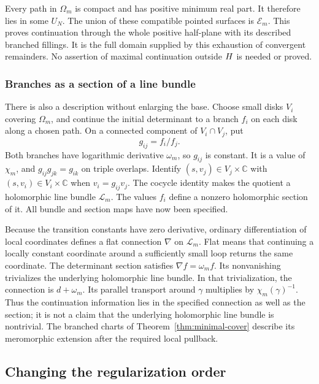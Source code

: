 Every path in \(\Omega_m\) is compact and has positive minimum real
part.  It therefore lies in some \(U_N\).  The union of these compatible
pointed surfaces is \(\mathcal E_m\).  This proves continuation through
the whole positive half-plane with its described branched fillings.
It is the full domain supplied by this exhaustion of convergent
remainders.  No assertion of maximal continuation outside \(H\) is
needed or proved.

\subsubsection{Branches as a section of a line bundle}

There is also a description without enlarging the base.
Choose small disks \(V_i\) covering \(\Omega_m\), and continue the
initial determinant to a branch \(f_i\) on each disk along a chosen path.
On a connected component of \(V_i\cap V_j\), put
\[
 g_{ij}=f_i/f_j.
\]
Both branches have logarithmic derivative \(\omega_m\), so \(g_{ij}\)
is constant.  It is a value of \(\chi_m\), and
\(g_{ij}g_{jk}=g_{ik}\) on triple overlaps.
Identify \((s,v_j)\in V_j\times\mathbb C\) with
\((s,v_i)\in V_i\times\mathbb C\) when \(v_i=g_{ij}v_j\).
The cocycle identity makes the quotient a holomorphic line bundle
\(\mathcal L_m\).  The values \(f_i\) define a nonzero holomorphic
section of it.  All bundle and section maps have now been specified.

Because the transition constants have zero derivative, ordinary
differentiation of local coordinates defines a flat connection \(\nabla\)
on \(\mathcal L_m\).  Flat means that continuing a locally constant
coordinate around a sufficiently small loop returns the same coordinate.
The determinant section satisfies \(\nabla f=\omega_m f\).
Its nonvanishing trivializes the underlying holomorphic line bundle.
In that trivialization, the connection is \(d+\omega_m\).
Its parallel transport around \(\gamma\) multiplies by
\(\chi_m(\gamma)^{-1}\).  Thus the continuation information lies in the
specified connection as well as the section; it is not a claim that the
underlying holomorphic line bundle is nontrivial.
The branched charts of Theorem~\ref{thm:minimal-cover} describe its
meromorphic extension after the required local pullback.

\subsection{Changing the regularization order}

